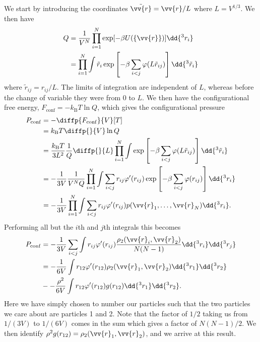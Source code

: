 \documentclass[fleqn]{NotesClass}
\newcommand*{\boltzmann}{k_{\mathrm{B}}}
\begin{document}
    We start by introducing the coordinates \(\tilde{\vv{r}} = \vv{r} / L\) where \(L = V^{1/3}\).
    We then have
    \begin{align}
        Q &= \frac{1}{V^N} \prod_{i = 1}^{N} \exp[-\beta U(\{\vv{r}\})] \dd{^3r_i}\\
        &= \prod_{i = 1}^{N} \int \tilde{r}_i \exp\left[ -\beta \sum_{i < j} \varphi(L \tilde{r}_{ij}) \right] \dd{^3\tilde{r}_i}
    \end{align}
    where \(\tilde{r}_{ij} = r_{ij}/L\).
    The limits of integration are independent of \(L\), whereas before the change of variable they were from 0 to \(L\).
    We then have the configurational free energy, \(F_{\mathrm{conf}} = -\boltzmann T \ln Q\), which gives the configurational pressure
    \begin{align}
        P_{\mathrm{conf}} &= -\diffp{F_{\mathrm{conf}}}{V}[T]\\
        &= \boltzmann T \diffp{}{V}\ln Q\\
        &= \frac{\boltzmann T}{3L^2} \frac{1}{Q} \diffp{}{L} \prod_{i = 1}^{N} \int \exp\left[ -\beta \sum_{i < j} \varphi(L\tilde{r}_{ij}) \right] \dd{^3\tilde{r}_i}\\
        &= - \frac{1}{3V} \frac{1}{V^NQ} \prod_{i = 1}^{N} \int \sum_{i < j} r_{ij} \varphi'(r_{ij}) \exp\left[ -\beta \sum_{i < j} \varphi(r_{ij}) \right] \dd{^3r_i}\\
        &= - \frac{1}{3V} \prod_{i = 1}^{N} \int \sum_{i < j} r_{ij} \varphi'(r_{ij}) p(\vv{r}_1, \dotsc, \vv{r}_N) \dd{^3r_i}.
    \end{align}
    Performing all but the \(i\)th and \(j\)th integrals this becomes
    \begin{align}
        P_{\mathrm{conf}} &= -\frac{1}{3V} \sum_{i < j} \int r_{ij} \varphi'(r_{ij}) \frac{\rho_2(\vv{r}_i, \vv{r}_2)}{N(N - 1)} \dd{^3r_i} \dd{^3r_j}\\
        &= -\frac{1}{6V} \int r_{12} \varphi'(r_{12}) \rho_2(\vv{r}_1, \vv{r}_2) \dd{^3r_1} \dd{^3r_2}\\
        &- -\frac{\rho^2}{6V} \int r_{12} \varphi'(r_{12}) g(r_{12}) \dd{^3r_1}\dd{^3r_2}.
    \end{align}
    Here we have simply chosen to number our particles such that the two particles we care about are particles 1 and 2.
    Note that the factor of \(1/2\) taking us from \(1/(3V)\) to \(1/(6V)\) comes in the sum which gives a factor of \(N(N - 1)/2\).
    We then identify \(\rho^2g(r_{12}) = \rho_2(\vv{r}_1, \vv{r}_2)\), and we arrive at this result.
    
\end{document}
